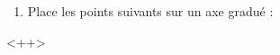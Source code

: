 
\begin{exercice}\label{exo2smath-0238}

    \begin{enumerate}
        \item
            Place les points suivants sur un axe gradué :

    \end{enumerate}
    <++>


\end{exercice}
